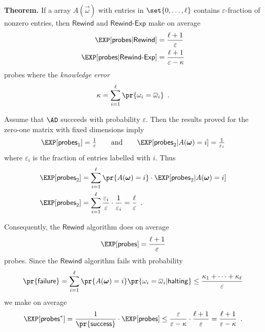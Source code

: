 \documentclass[landscape,footrule]{foils}
\newcommand{\probes}{\mathsf{probes}}
\begin{document}

\textbf{Theorem.}  If a array $A(\vec{\omega})$ with entries in
$\set{0,\ldots,\ell}$ contains $\varepsilon$-fraction of nonzero entries,
then $\mathsf{Rewind}$ and $\mathsf{Rewind\text{-}Exp}$ make on
average
\begin{align*}
  \EXP[\probes| \mathsf{Rewind}] &=\frac{\ell+1}{\varepsilon}\\
  \EXP[\probes|\mathsf{Rewind\text{-}Exp}] &=\frac{\ell+1}{\varepsilon-\kappa}
\end{align*}
probes where the \emph{knowledge error} 
\begin{align*}
 \kappa=\sum_{i=1}^\ell\pr{\omega_i=\overline{\omega}_i}\enspace.  
\end{align*}



\enlargethispage{1cm}

Assume that $\AD$ succeeds with probability $\varepsilon$. Then the
results proved for the zero-one  matrix with fixed dimensions  
imply
\begin{align*}
  \EXP[\probes_1]=\textstyle \frac{1}{\varepsilon}\qquad\text{and}\qquad
  \EXP[\probes_2|A(\vec{\omega})=i]=\textstyle\frac{1}{\varepsilon_{i}}
\end{align*}
where $\varepsilon_i$ is the fraction of entries labelled with $i$. Thus
\begin{align*}
  \EXP[\probes_2]%
  &=\sum_{i=1}^{\ell}\pr{A(\vec{\omega})=i}\cdot \EXP[\probes_2|A(\vec{\omega})=i]\\
  \EXP[\probes_2] &=
  \sum_{i=1}^{\ell}\frac{\varepsilon_{i}}{\varepsilon}\cdot\frac{1}{\varepsilon_{i}}
  =\frac{\ell}{\varepsilon}\enspace.
\end{align*}




Consequently, the $\mathsf{Rewind}$ algorithm does on average
\begin{align*}
  \EXP[\probes]= \frac{\ell+1}{\varepsilon}
\end{align*}
probes. Since the $\mathsf{Rewind}$ algorithm fails with probability
\begin{align*}
  \pr{\mathsf{failure}}%
  =\sum_{i=1}^\ell\pr{A(\vec{\omega})=i}\pr{\omega_i=\overline{\omega}_i|\mathsf{halting}}
   \leq\frac{\kappa_1+\cdots+\kappa_\ell}{\varepsilon}
\end{align*}
we make on average 
\begin{align*}
  \EXP[\probes^*]=\frac{1}{\pr{\mathsf{success}}}\cdot\EXP[\probes]
  \leq\frac{\varepsilon}{\varepsilon-\kappa}\cdot\frac{\ell+1}{\varepsilon}
  =\frac{\ell+1}{\varepsilon-\kappa}\enspace.
\end{align*}
\end{document}
